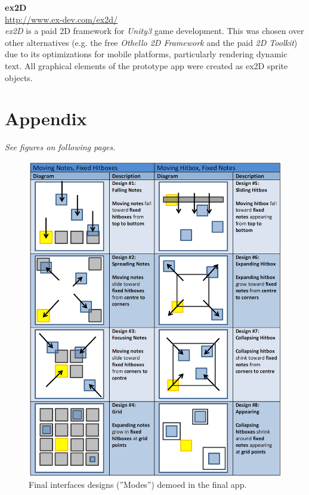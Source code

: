 \documentclass{sig-alternate}
\begin{document}
\noindent \textbf{ex2D} \\
\url{http://www.ex-dev.com/ex2d/} \\
\textit{ex2D} is a paid 2D framework for \textit{Unity3} game development. This was chosen over other alternatives (e.g. the free \textit{Othello 2D Framework} and the paid \textit{2D Toolkit}) due to its optimizations for mobile platforms, particularly rendering dynamic text. All graphical elements of the prototype app were created as ex2D sprite objects.

\section{Appendix}
\label{sec:appendix}
\textit{See figures on following pages.}




\begin{figure}[htb!]
	\begin{center}
		\includegraphics[width=0.9\linewidth]{figure_demo_interfaces}
	\end{center}
	\vspace{-12pt}
	\caption{Final interfaces designs (''Modes'') demoed in the final app.}
	\label{fig:demo_interfaces}
\end{figure}
\end{document}
